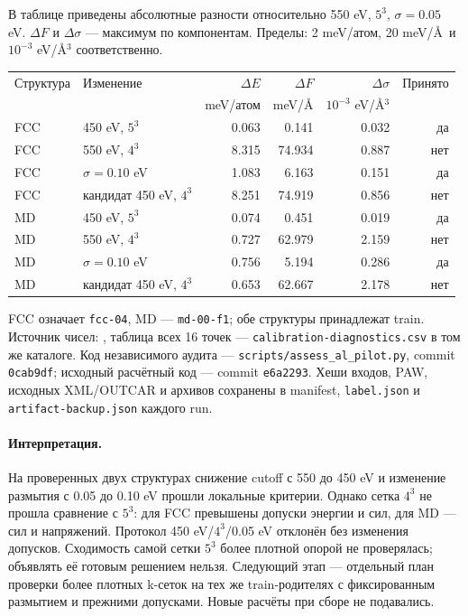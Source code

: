 \documentclass[11pt,a4paper]{article}
\begin{document}
В таблице приведены абсолютные разности относительно
550 eV, $5^3$, $\sigma=0.05$ eV. $\Delta F$ и $\Delta\sigma$ ---
максимум по компонентам. Пределы: 2 meV/атом, 20 meV/\AA\ и
$10^{-3}$ eV/\AA$^3$ соответственно.
\begin{center}
\small
\begin{tabular}{llrrrr}
\toprule
Структура & Изменение & $\Delta E$ & $\Delta F$ & $\Delta\sigma$ & Принято\\
 & & meV/атом & meV/\AA & $10^{-3}$ eV/\AA$^3$ & \\
\midrule
FCC & 450 eV, $5^3$ & 0.063 & 0.141 & 0.032 & да\\
FCC & 550 eV, $4^3$ & 8.315 & 74.934 & 0.887 & нет\\
FCC & $\sigma=0.10$ eV & 1.083 & 6.163 & 0.151 & да\\
FCC & кандидат 450 eV, $4^3$ & 8.251 & 74.919 & 0.856 & нет\\
\midrule
MD & 450 eV, $5^3$ & 0.074 & 0.451 & 0.019 & да\\
MD & 550 eV, $4^3$ & 0.727 & 62.979 & 2.159 & нет\\
MD & $\sigma=0.10$ eV & 0.756 & 5.194 & 0.286 & да\\
MD & кандидат 450 eV, $4^3$ & 0.653 & 62.667 & 2.178 & нет\\
\bottomrule
\end{tabular}
\end{center}
FCC означает \texttt{fcc-04}, MD --- \texttt{md-00-f1}; обе структуры
принадлежат train. Источник чисел:
,
таблица всех 16 точек --- \texttt{calibration-diagnostics.csv} в том же каталоге.
Код независимого аудита --- \texttt{scripts/assess\_al\_pilot.py},
commit \texttt{0cab9df}; исходный расчётный код --- commit \texttt{e6a2293}.
Хеши входов, PAW, исходных XML/OUTCAR и архивов сохранены в manifest,
\texttt{label.json} и \texttt{artifact-backup.json} каждого run.

\paragraph{Интерпретация.} На проверенных двух структурах снижение cutoff
с 550 до 450 eV и изменение размытия с 0.05 до 0.10 eV прошли локальные
критерии. Однако сетка $4^3$ не прошла сравнение с $5^3$:
для FCC превышены допуски энергии и сил, для MD --- сил и напряжений.
Протокол 450 eV/$4^3$/0.05 eV отклонён без изменения допусков.
Сходимость самой сетки $5^3$ более плотной опорой не проверялась;
объявлять её готовым решением нельзя. Следующий этап --- отдельный план
проверки более плотных k-сеток на тех же train-родителях с фиксированным
размытием и прежними допусками. Новые расчёты при сборе не подавались.
\end{document}
